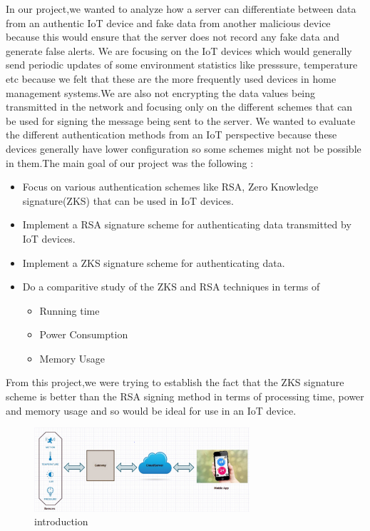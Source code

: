 \documentclass[letterpaper,twocolumn,10pt]{article}
\begin{document}
   In our project,we wanted to analyze how a server can differentiate between data from an authentic IoT device and fake data from another malicious device because this would ensure that
the server does not record any fake data and generate false alerts. We are focusing on the IoT devices which would generally send periodic updates of some environment statistics like presssure,
temperature etc because we felt that these are the more frequently used devices in home management systems.We are also not encrypting the data values being transmitted in the network and focusing only 
on the different schemes that can be used for signing the message being sent to the server. We wanted to evaluate the different authentication methods from an IoT perspective because these devices
generally have lower configuration so some schemes might not be possible in them.The main goal of our project was the following :

\begin{itemize} 

\item  Focus on various authentication schemes like RSA, Zero Knowledge signature(ZKS) that can be used in IoT devices.

\item  Implement a RSA signature scheme for authenticating data transmitted by IoT devices.

\item  Implement a ZKS signature scheme for authenticating data.

\item Do a comparitive study of the ZKS and RSA techniques in terms of 
\begin{itemize}  
 \item Running time 
 \item Power Consumption
 \item Memory Usage
\end{itemize}   
\end{itemize}   

From this project,we were trying to establish the fact that the ZKS signature scheme is better than the RSA signing method in terms of processing time, power and memory usage and so would be ideal for use
in an IoT device.
 
\begin{figure}[htbp]
	\begin{center}
        \includegraphics[width=80mm]{intro.png}
		\caption{introduction}
		\label{Introduction}
	\end{center}
\end{figure}
\end{document}
